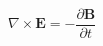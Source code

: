 \documentclass[border=2pt]{standalone}
\begin{document}
\fontsize{26}{30}\selectfont\color{cText}
$\nabla\times\mathbf{E} = -\dfrac{\partial \mathbf{B}}{\partial t}$
\end{document}
